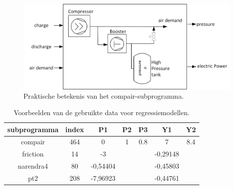 		\begin{figure}
			\centering
			\includegraphics[width=120mm]{afbeeldingen/compairPraktijk.PNG}
			\caption[Praktische betekenis van het compair-subprogramma.]{Praktische betekenis van het compair-subprogramma\cite{bron:compair}.}
			\label{fig:compairPraktijk}
		\end{figure}
	
		\begin{table}[]
			\centering
			\begin{tabular}{ccccccc}
				\hline
				subprogramma                   & index & P1       & P2 & P3  & Y1       & Y2  \\ \hline
				\multicolumn{1}{c|}{compair}   & 464   & 0        & 1  & 0.8 & 7        & 8.4 \\
				\multicolumn{1}{c|}{friction}  & 14    & -3       &    &     & -0,29148 &     \\
				\multicolumn{1}{c|}{narendra4} & 80    & -0,54404 &    &     & -0,45803 &     \\
				\multicolumn{1}{c|}{pt2}       & 208   & -7,96923 &    &     & -0,44761 &     \\ \hline
			\end{tabular}
			\caption{Voorbeelden van de gebruikte data voor regressiemodellen.}
			\label{tab:dataVoorbeelden}
		\end{table}
	
